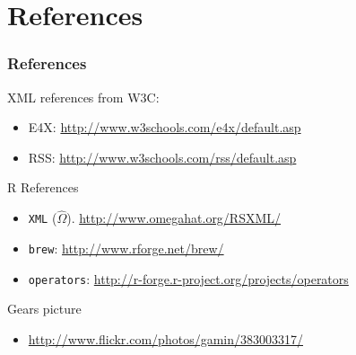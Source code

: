 \documentclass[smaller]{beamer}
\newcommand{\rfun}[1]{\texttt{#1}}
\begin{document}
{
 \begin{frame}[plain]
 \end{frame}
}



\begin{frame}[plain]

\end{frame}
 
\section{References}

\begin{frame}[fragile]
\frametitle{References}

XML references from W3C: 
\begin{itemize}
 \item E4X: \url{http://www.w3schools.com/e4x/default.asp}
 \item RSS: \url{http://www.w3schools.com/rss/default.asp}
\end{itemize}

R References
\begin{itemize}
 \item \rfun{XML} ($\hat{\Omega}$). \url{http://www.omegahat.org/RSXML/}
 \item \rfun{brew}: \url{http://www.rforge.net/brew/}
 \item \rfun{operators}: \url{http://r-forge.r-project.org/projects/operators}
\end{itemize}

Gears picture
\begin{itemize}
 \item \url{http://www.flickr.com/photos/gamin/383003317/}
\end{itemize}


\end{frame}
\end{document}

